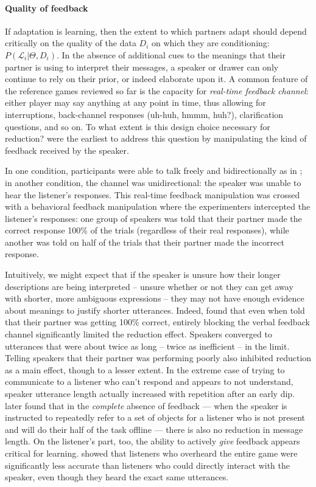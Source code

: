 \paragraph{Quality of feedback}

If adaptation is learning, then the extent to which partners adapt should depend critically on the quality of the data $D_i$ on which they are conditioning: $P(\mathcal{L}_i | \Theta, D_i)$. In the absence of additional cues to the meanings that their partner is using to interpret their messages, a speaker or drawer can only continue to rely on their prior, or indeed elaborate upon it. A common feature of the reference games reviewed so far is the capacity for \emph{real-time feedback channel}: either player may say anything at any point in time, thus allowing for interruptions, back-channel responses (uh-huh, hmmm, huh?), clarification questions, and so on. To what extent is this design choice necessary for reduction?  were the earliest to address this question by manipulating the kind of feedback received by the speaker.

In one condition, participants were able to talk freely and bidirectionally as in ; in another condition, the channel was unidirectional: the speaker was unable to hear the listener's responses. This real-time feedback manipulation was crossed with a behavioral feedback manipulation where the experimenters intercepted the listener's responses: one group of speakers was told that their partner made the correct response 100\% of the trials (regardless of their real responses), while another was told on half of the trials that their partner made the incorrect response. 

Intuitively, we might expect that if the speaker is unsure how their longer descriptions are being interpreted -- unsure whether or not they can get away with shorter, more ambiguous expressions -- they may not have enough evidence about meanings to justify shorter utterances. Indeed,  found that even when told that their partner was getting 100\% correct, entirely blocking the verbal feedback channel significantly limited the reduction effect. Speakers converged to utterances that were about twice as long -- twice as inefficient -- in the limit. Telling speakers that their partner was performing poorly also inhibited reduction as a main effect, though to a lesser extent. In the extreme case of trying to communicate to a listener who can't respond and appears to not understand, speaker utterance length actually increased with repetition after an early dip.  later found that in the \emph{complete} absence of feedback --- when the speaker is instructed to repeatedly refer to a set of objects for a listener who is not present and will do their half of the task offline --- there is also no reduction in message length. On the listener's part, too, the ability to actively \emph{give} feedback appears critical for learning.  showed that listeners who overheard the entire game were significantly less accurate than listeners who could directly interact with the speaker, even though they heard the exact same utterances.

